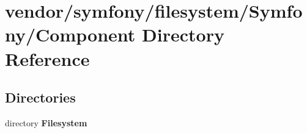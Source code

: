 \section{vendor/symfony/filesystem/\+Symfony/\+Component Directory Reference}
\label{dir_382d6a347ce28105965e4aeeb76819c2}
\subsection*{Directories}
\begin{DoxyCompactItemize}
\item 
directory {\bf Filesystem}
\end{DoxyCompactItemize}
